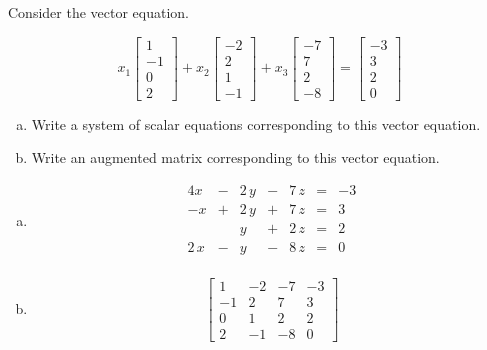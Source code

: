 
\begin{exerciseStatement}


Consider the vector equation.

\[ x_{1} \left[\begin{array}{c}
1 \\
-1 \\
0 \\
2
\end{array}\right] + x_{2} \left[\begin{array}{c}
-2 \\
2 \\
1 \\
-1
\end{array}\right] + x_{3} \left[\begin{array}{c}
-7 \\
7 \\
2 \\
-8
\end{array}\right] = \left[\begin{array}{c}
-3 \\
3 \\
2 \\
0
\end{array}\right] \]
\begin{enumerate}[(a)]
\item  Write a system of scalar equations corresponding to this vector equation. 
\item  Write an augmented matrix corresponding to this vector equation. 
\end{enumerate}
    
\end{exerciseStatement}
    
\begin{exerciseAnswer} 

\begin{enumerate}[(a)]
\item 
\begin{alignat*}{4} x &-& 2 \, y &-& 7 \, z &=& -3 \\-x &+& 2 \, y &+& 7 \, z &=& 3 \\ & & y &+& 2 \, z &=& 2 \\2 \, x &-& y &-& 8 \, z &=& 0 \\ \end{alignat*}
            
\item \[ \left[\begin{array}{ccc|c}
1 & -2 & -7 & -3 \\
-1 & 2 & 7 & 3 \\
0 & 1 & 2 & 2 \\
2 & -1 & -8 & 0
\end{array}\right] \]
\end{enumerate}
    
\end{exerciseAnswer}
    

